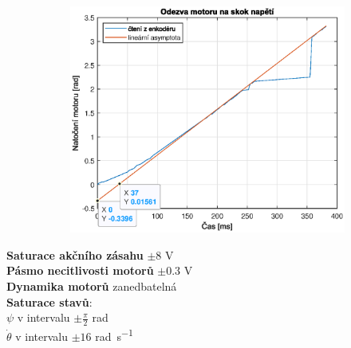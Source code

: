 \documentclass{beamer}
\begin{document}
\begin{frame}
\begin{figure}
\begin{subfigure}{0.45\textwidth}
                \centerline{\includegraphics[width=\linewidth]{motor_skok.eps}}
            \end{subfigure}
        \end{figure}
        
        
        \textbf{Saturace akčního zásahu} $\pm 8$ \si{\volt}\\
        \textbf{Pásmo necitlivosti motorů} $\pm 0.3$ \si{\volt}\\        
        \textbf{Dynamika motorů} zanedbatelná \\
        \textbf{Saturace stavů}: \\
        \centering
         $\psi$ v intervalu $\pm \frac{\pi}{2}$ \si{\radian} \\
         $\dot{\theta}$ v intervalu $\pm 16$ \si{\radian\per\second} \\
    
    \end{frame}
    
\end{document}
